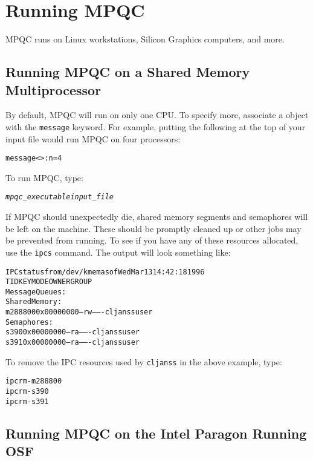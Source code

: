 
\chapter{Running MPQC}

MPQC runs on Linux workstations, Silicon Graphics computers,
and more.

\section{Running MPQC on a Shared Memory Multiprocessor}

By default, MPQC will run on only one CPU.  To specify more, associate
a  object with the \verb|message|
keyword.  For example, putting the following at the top of your input file
would run MPQC on four processors:

\begin{alltt}
message<>: n = 4
\end{alltt}


To run MPQC, type:
\begin{alltt}
{\itshape mpqc_executable} {\itshape input_file}
\end{alltt}

If MPQC should unexpectedly die, shared memory segments and
semaphores will be left on the machine.  These should be promptly
cleaned up or other jobs may be prevented from running.  To
see if you have any of these resources allocated, use the
\verb|ipcs| command.  The output will look something
like:

\begin{alltt}
IPC status from /dev/kmem as of Wed Mar 13 14:42:18 1996
T     ID     KEY        MODE       OWNER    GROUP
Message Queues:
Shared Memory:
m 288800 0x00000000 --rw-------  cljanss     user
Semaphores:
s    390 0x00000000 --ra-------  cljanss     user
s    391 0x00000000 --ra-------  cljanss     user
\end{alltt}

To remove the IPC resources used by \verb|cljanss| in
the above example, type:

\begin{alltt}
ipcrm -m 288800
ipcrm -s 390
ipcrm -s 391
\end{alltt}

\section{Running MPQC on the Intel Paragon Running OSF}

